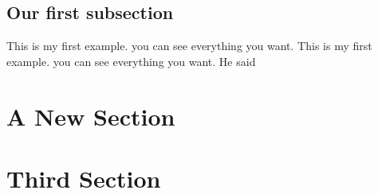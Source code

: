 \documentclass{article}
\begin{document}
\subsection{Our first subsection}
This is my first example. you can see everything you want. This is my first example. you can see everything you want.
He said 

\section*{A New Section}

\blindtext
\section{Third Section}

\begin{comment} 
This is our comment. This is our comment. This is our comment. This is our comment. 
This is our comment. This is our comment. This is our comment. This is our comment. 
This is our comment. This is our comment. 
\end{comment}
\end{document}
